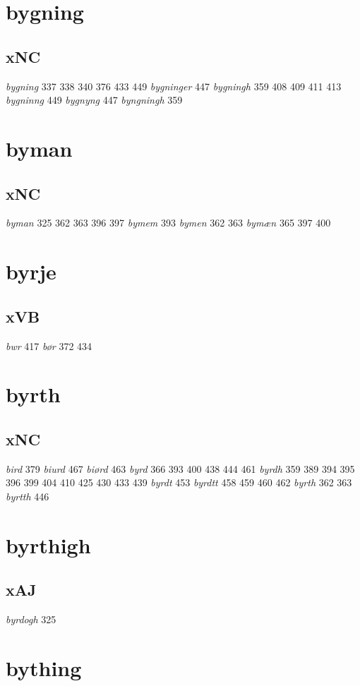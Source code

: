 \documentclass[a4paper,twocolumn]{article}
\begin{document}
\section{bygning}
\label{sec:org35118ad}
\subsection{xNC}
\label{sec:org60527b4}
\emph{bygning} 337 338 340 376 433 449 \emph{bygninger} 447 \emph{bygningh} 359 408 409 411 413 \emph{bygninng} 449 \emph{bygnyng} 447 \emph{byngningh} 359 
\section{byman}
\label{sec:org7a0d9da}
\subsection{xNC}
\label{sec:orgfd95adc}
\emph{byman} 325 362 363 396 397 \emph{bymem} 393 \emph{bymen} 362 363 \emph{bymæn} 365 397 400 
\section{byrje}
\label{sec:org0be4ea1}
\subsection{xVB}
\label{sec:orga9a7493}
\emph{bwr} 417 \emph{bør} 372 434 
\section{byrth}
\label{sec:org847511a}
\subsection{xNC}
\label{sec:orga8f1526}
\emph{bird} 379 \emph{biurd} 467 \emph{biørd} 463 \emph{byrd} 366 393 400 438 444 461 \emph{byrdh} 359 389 394 395 396 399 404 410 425 430 433 439 \emph{byrdt} 453 \emph{byrdtt} 458 459 460 462 \emph{byrth} 362 363 \emph{byrtth} 446 
\section{byrthigh}
\label{sec:org77e52df}
\subsection{xAJ}
\label{sec:org53dd37d}
\emph{byrdogh} 325 
\section{bything}
\label{sec:orgf2584ef}
\end{document}
